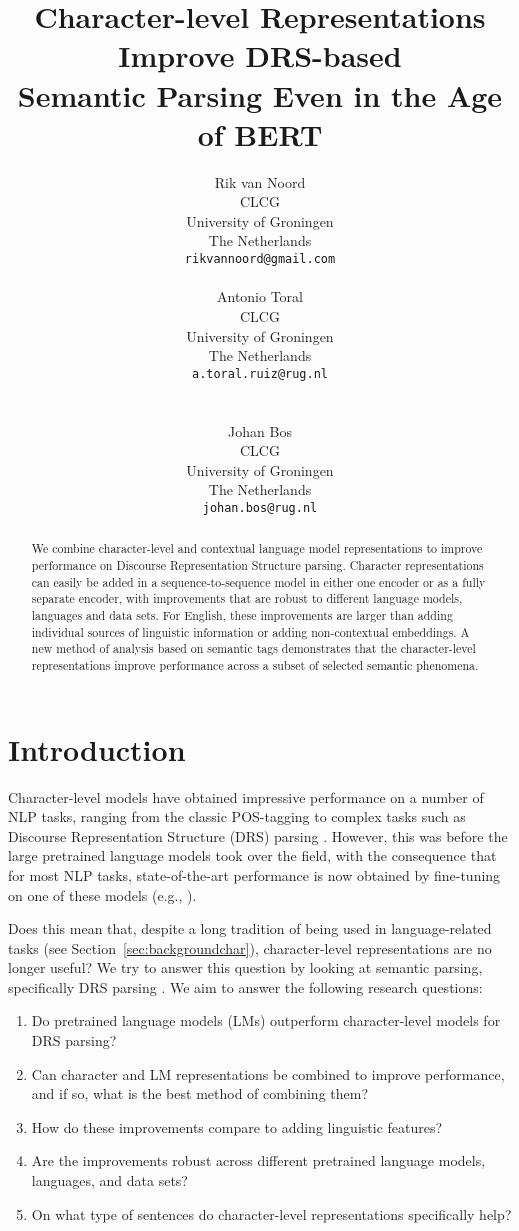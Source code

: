 \documentclass[11pt,a4paper]{article}
\title{Character-level Representations Improve DRS-based\\ Semantic Parsing Even in the Age of BERT}
\author{Rik van Noord \\
  CLCG \\
  University of Groningen \\
  The Netherlands \\
  \normalsize{\texttt{rikvannoord@gmail.com}} \\\And 

  Antonio Toral \\
  CLCG \\
  University of Groningen \\
  The Netherlands \\
  \normalsize{\texttt{a.toral.ruiz@rug.nl}} \\ \\\And
  
  Johan Bos \\
  CLCG \\
  University of Groningen \\
  The Netherlands \\
  \normalsize{\texttt{johan.bos@rug.nl}} \\}
\date{}
\begin{document}
\maketitle
\begin{abstract}
We combine character-level and contextual language model representations to improve performance on Discourse Representation Structure parsing. Character representations can easily be added in a sequence-to-sequence model in either one encoder or as a fully separate encoder, with improvements that are robust to different language models, languages and data sets. For English, these improvements are larger than adding individual sources of linguistic information or adding non-contextual embeddings. A new method of analysis based on semantic tags demonstrates that the character-level representations improve performance across a subset of selected semantic phenomena.
\end{abstract}

\section{Introduction}
\label{sec:intro}

Character-level models have obtained impressive performance on a number of NLP tasks, ranging from the classic POS-tagging \citep{santos2014learning} to complex tasks such as Discourse Representation Structure (DRS) parsing \citep{drstacl:18}. However, this was before the large pretrained language models \citep{Peters:2018,bert:19} took over the field, with the consequence that for most NLP tasks, state-of-the-art performance is now obtained by fine-tuning on one of these models (e.g., \citealp{conneau-etal-2020-unsupervised}).

Does this mean that, despite a long tradition of being used in language-related tasks (see Section~\ref{sec:backgroundchar}), character-level representations are no longer useful? We try to answer this question by looking at semantic parsing, specifically DRS parsing \citep{eacl:pmb, pmb-LREC:18}. We aim to answer the following research questions: 


\begin{enumerate}

\setlength\itemsep{-4pt}

   \item Do pretrained language models (LMs) outperform character-level models for DRS parsing?

    \item Can character and LM representations be combined to improve performance, and if so, what is the best method of combining them? 
    
    \item How do these improvements compare to adding linguistic features?
    
    \item Are the improvements robust across different pretrained language models, languages, and data sets?
    
    \item On what type of sentences do character-level representations specifically help?
\end{enumerate}
\end{document}
